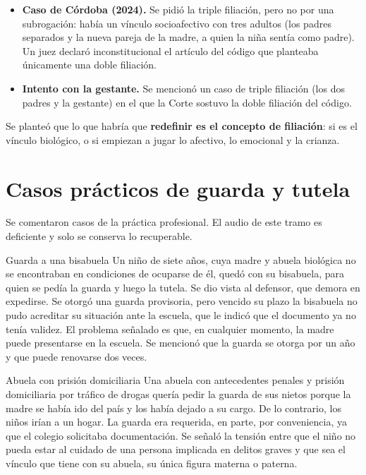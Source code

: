 \documentclass[12pt,oneside]{book}
\begin{document}
\begin{itemize}
    \item \textbf{Caso de Córdoba (2024).} Se pidió la triple filiación, pero no por una subrogación: había un vínculo socioafectivo con tres adultos (los padres separados y la nueva pareja de la madre, a quien la niña sentía como padre). Un juez declaró inconstitucional el artículo del código que planteaba únicamente una doble filiación.
    \item \textbf{Intento con la gestante.} Se mencionó un caso de triple filiación (los dos padres y la gestante) en el que la Corte sostuvo la doble filiación del código.
\end{itemize}

Se planteó que lo que habría que \textbf{redefinir es el concepto de filiación}: si es el vínculo biológico, o si empiezan a jugar lo afectivo, lo emocional y la crianza.


\section{Casos prácticos de guarda y tutela}

Se comentaron casos de la práctica profesional. El audio de este tramo es deficiente y solo se conserva lo recuperable.

\begin{example}{Guarda a una bisabuela}
Un niño de siete años, cuya madre y abuela biológica no se encontraban en condiciones de ocuparse de él, quedó con su bisabuela, para quien se pedía la guarda y luego la tutela. Se dio vista al defensor, que demora en expedirse. Se otorgó una guarda provisoria, pero vencido su plazo la bisabuela no pudo acreditar su situación ante la escuela, que le indicó que el documento ya no tenía validez. El problema señalado es que, en cualquier momento, la madre puede presentarse en la escuela. Se mencionó que la guarda se otorga por un año y que puede renovarse dos veces.
\end{example}


\begin{example}{Abuela con prisión domiciliaria}
Una abuela con antecedentes penales y prisión domiciliaria por tráfico de drogas quería pedir la guarda de sus nietos porque la madre se había ido del país y los había dejado a su cargo. De lo contrario, los niños irían a un hogar. La guarda era requerida, en parte, por conveniencia, ya que el colegio solicitaba documentación. Se señaló la tensión entre que el niño no pueda estar al cuidado de una persona implicada en delitos graves y que sea el vínculo que tiene con su abuela, su única figura materna o paterna.
\end{example}
\end{document}
